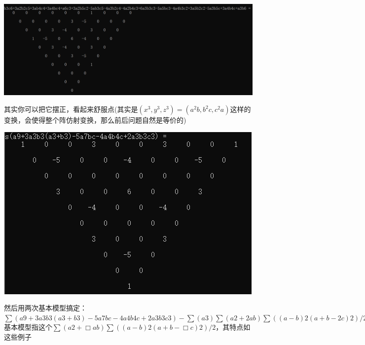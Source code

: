 \documentclass[UTF8]{ctexart}
\begin{document}
\subsection{}
\begin{center}
	\includegraphics[width=1\linewidth]{a28}
\end{center}
其实你可以把它摆正，看起来舒服点(其实是$ (x^{3},y^{3},z^{3})=(a^{2}b,b^{2}c,c^{2}a) $这样的变换，会使得整个阵仿射变换，那么前后问题自然是等价的)
\begin{center}
	\includegraphics[width=0.85\linewidth]{a29}
\end{center}
然后用两次基本模型搞定：$ \displaystyle \sum (a9+3a3b3(a3+b3)-5a7bc-4a4b4c+2a3b3c3)-\displaystyle \sum (a3)\displaystyle \sum (a2+2ab)\displaystyle \sum ((a-b)2(a+b-2c)2)/2-abc\displaystyle \sum (a2+7/3ab)\displaystyle \sum ((a-b)2(a+b-7/3c)2)/2 $\\
基本模型指这个$ \displaystyle \sum (a2+\Box ab)\displaystyle \sum ((a-b)2(a+b-\Box c)2)/2 $，其特点如这些例子
\end{document}
